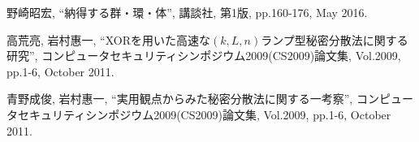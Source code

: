 \documentclass[twocolumn, fleqn, uplatex]{jsarticle}
\begin{document}
\begin{thebibliography}{9}
		野崎昭宏, 
		``納得する群・環・体'', 
		講談社, 第1版, pp.160-176, May 2016.

		高荒亮, 岩村惠一, 
		``XORを用いた高速な$(k,L,n)$ランプ型秘密分散法に関する研究'', 
		コンピュータセキュリティシンポジウム2009(CS2009)論文集, Vol.2009, pp.1-6, October 2011.
	
		青野成俊, 岩村惠一, 
		``実用観点からみた秘密分散法に関する一考察'', 
		コンピュータセキュリティシンポジウム2009(CS2009)論文集, Vol.2009, pp.1-6, October 2011.

\end{thebibliography}
\end{document}
